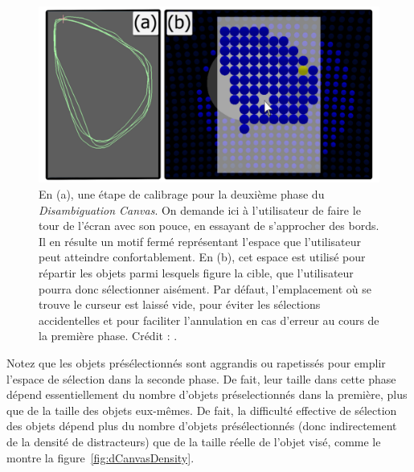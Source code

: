 	\begin{figure}[ht]
		\centering
		\includegraphics[width=\textwidth]{figures/ch2/dCanvasLayout}
		\caption[\emph{Disambiguation Canvas} --- Calibrage]{En (a), une étape de calibrage pour la deuxième phase du \emph{Disambiguation Canvas}. On demande ici à l'utilisateur de faire le tour de l'écran avec son pouce, en essayant de s'approcher des bords. Il en résulte un motif fermé représentant l'espace que l'utilisateur peut atteindre confortablement. En (b), cet espace est utilisé pour répartir les objets parmi lesquels figure la cible, que l'utilisateur pourra donc sélectionner aisément. Par défaut, l'emplacement où se trouve le curseur est laissé vide, pour éviter les sélections accidentelles et pour faciliter l'annulation en cas d'erreur au cours de la première phase. Crédit : \cite{debarba2013disambiguation}.}
		\label{fig:dCanvasLayout}
	\end{figure}
	
	Notez que les objets présélectionnés sont aggrandis ou rapetissés pour emplir l'espace de sélection dans la seconde phase. De fait, leur taille dans cette phase dépend essentiellement du nombre d'objets préselectionnés dans la première, plus que de la taille des objets eux-mêmes. De fait, la difficulté effective de sélection des objets dépend plus du nombre d'objets présélectionnés (donc indirectement de la densité de distracteurs) que de la taille réelle de l'objet visé, comme le montre la figure~\ref{fig:dCanvasDensity}.
	
